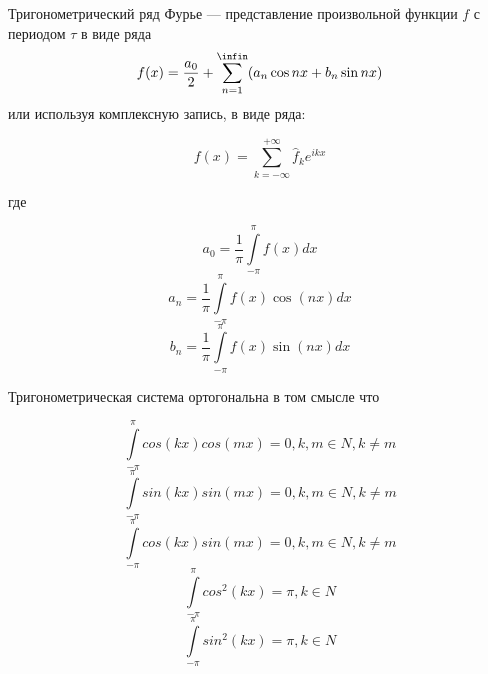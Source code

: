 Тригонометрический ряд Фурье — представление произвольной функции $f$ с периодом $\tau$  в виде ряда
$$f(x)=\frac{a_0}{2} + \sum^{\infin}_{n=1} (a_n \cos nx + b_n \sin nx)$$
или используя комплексную запись, в виде ряда:

$$f(x) = \sum\limits_{k=-\infty}^{+\infty} \hat{f}_k e^{ikx}$$

где

$$a_0= \frac{1}{\pi}\int\limits_{-\pi}^{\pi}f(x)dx$$
$$a_n= \frac{1}{\pi}\int\limits_{-\pi}^{\pi}f(x)\cos(nx)dx$$
$$b_n= \frac{1}{\pi}\int\limits_{-\pi}^{\pi}f(x)\sin(nx)dx$$


Тригонометрическая система ортогональна в том смысле что

$$\int\limits_{-\pi}^{\pi}cos(kx)cos(mx)=0, k,m \in N, k\ne m$$
$$\int\limits_{-\pi}^{\pi}sin(kx)sin(mx)=0, k,m \in N, k\ne m$$
$$\int\limits_{-\pi}^{\pi}cos(kx)sin(mx)=0, k,m \in N, k\ne m$$
$$\int\limits_{-\pi}^{\pi}cos^2(kx)=\pi, k \in N$$
$$\int\limits_{-\pi}^{\pi}sin^2(kx)=\pi, k \in N$$



